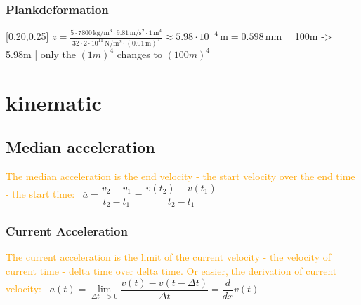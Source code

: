 \documentclass[main.tex,fontsize=8pt,paper=a4,paper=portrait,DIV=calc,]{scrartcl}
\begin{document}
\begin{multicols*}{2}
\subsubsection{Plankdeformation}
[0.20,0.25]\newline
\(z = \frac{5\cdot 7800\,\mathrm{kg}/\mathrm{m}^3\cdot 9.81\,\mathrm{m}/\mathrm{s}^2\cdot 1\,\mathrm{m}^4}{32\cdot 2\cdot 10^{11}\,\mathrm{N}/\mathrm{m}^2 \cdot \left(0.01\,\mathrm{m}\right)^2} \approx 5.98\cdot10^{-4}\,\mathrm{m} = 0.598\,\mathrm{mm}\quad\)\newline
100m -> 5.98m | only the \((1m)^4\) changes to \((100m)^4\)


\section{kinematic}
\subsection{Median acceleration}
\textcolor{orange}{The median acceleration is the end velocity - the start velocity over the end time - the start time:}\newline
\, \newline
\large \( \overset{\_}{a} = \dfrac{v_2 - v_1}{t_2 - t_1} = \dfrac{v(t_2) - v(t_1)}{t_2 - t_1} \) \newline
\normalsize 

\subsubsection{Current Acceleration}
\textcolor{orange}{The current acceleration is the limit of the current velocity - the velocity of current time - delta time over delta time. \newline
Or easier, the derivation of current velocity:}\newline
\, \newline
\large \( a(t) = \underset{\Delta t -> 0}{\lim} \dfrac{v(t) - v(t - \Delta t)}{\Delta t} = \dfrac{d}{dx}v(t)\) \newline
\normalsize


\end{multicols*}
\end{document}
